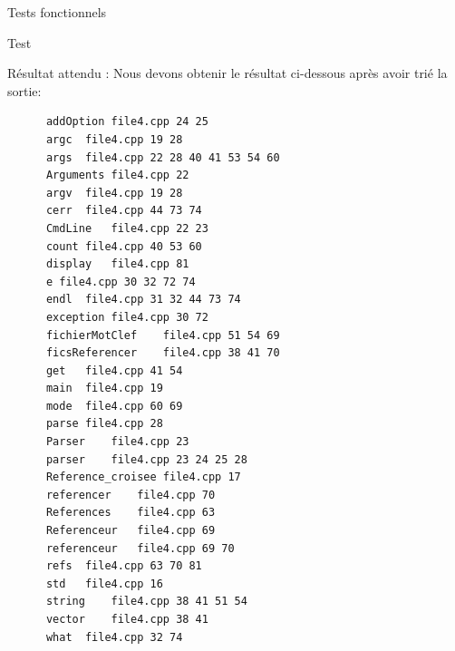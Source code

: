 \documentclass{article}
\begin{document}
\begin{section}{Tests fonctionnels}
\begin{subsection}{Test }
\begin{paragraph}{Résultat attendu :}
      Nous devons obtenir le résultat ci-dessous après avoir trié la sortie: 
      \begin{listing}[h!]
      \begin{verbatim}
	  addOption	file4.cpp 24 25	
	  argc	file4.cpp 19 28	
	  args	file4.cpp 22 28 40 41 53 54 60	
	  Arguments	file4.cpp 22	
	  argv	file4.cpp 19 28	
	  cerr	file4.cpp 44 73 74	
	  CmdLine	file4.cpp 22 23	
	  count	file4.cpp 40 53 60	
	  display	file4.cpp 81	
	  e	file4.cpp 30 32 72 74	
	  endl	file4.cpp 31 32 44 73 74	
	  exception	file4.cpp 30 72	
	  fichierMotClef	file4.cpp 51 54 69	
	  ficsReferencer	file4.cpp 38 41 70	
	  get	file4.cpp 41 54	
	  main	file4.cpp 19	
	  mode	file4.cpp 60 69	
	  parse	file4.cpp 28	
	  Parser	file4.cpp 23	
	  parser	file4.cpp 23 24 25 28	
	  Reference_croisee	file4.cpp 17	
	  referencer	file4.cpp 70	
	  References	file4.cpp 63	
	  Referenceur	file4.cpp 69	
	  referenceur	file4.cpp 69 70	
	  refs	file4.cpp 63 70 81	
	  std	file4.cpp 16	
	  string	file4.cpp 38 41 51 54	
	  vector	file4.cpp 38 41	
	  what	file4.cpp 32 74	
      \end{verbatim}
  
      \end{listing}
    \end{paragraph}
  \end{subsection}

\end{section}
\end{document}
